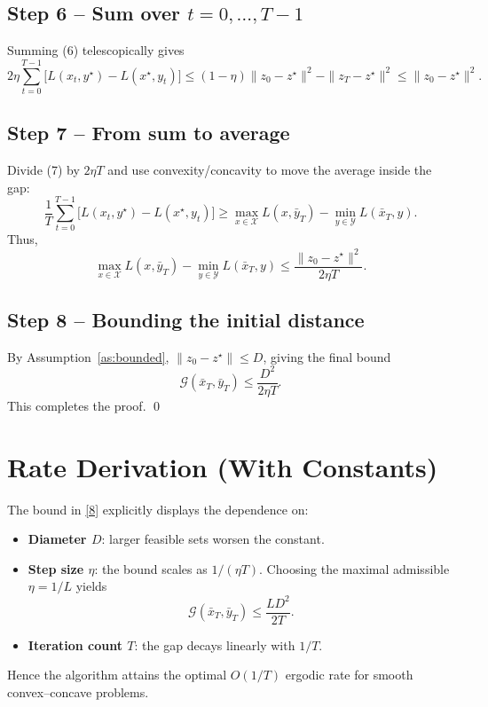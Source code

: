 \documentclass{article}
\begin{document}
\subsection*{Step 6 – Sum over $t=0,\dots,T-1$}
Summing (6) telescopically gives
\[
2\eta\sum_{t=0}^{T-1}\bigl[L(x_{t},y^{\star})-L(x^{\star},y_{t})\bigr]
\le (1-\eta)\|z_{0}-z^{\star}\|^{2}-\|z_{T}-z^{\star}\|^{2}
\le \|z_{0}-z^{\star}\|^{2}. \tag{7}
\]

\subsection*{Step 7 – From sum to average}
Divide (7) by $2\eta T$ and use convexity/concavity to move the average inside the gap:
\[
\frac{1}{T}\sum_{t=0}^{T-1}\bigl[L(x_{t},y^{\star})-L(x^{\star},y_{t})\bigr]
\ge
\max_{x\in\mathcal{X}}L(x,\bar y_{T})-\min_{y\in\mathcal{Y}}L(\bar x_{T},y).
\]
Thus,
\[
\boxed{
\max_{x\in\mathcal{X}}L(x,\bar y_{T})-\min_{y\in\mathcal{Y}}L(\bar x_{T},y)
\le
\frac{\|z_{0}-z^{\star}\|^{2}}{2\eta T}.}
\tag{8}
\]

\subsection*{Step 8 – Bounding the initial distance}
By Assumption~\ref{as:bounded}, $\|z_{0}-z^{\star}\|\le D$, giving the final bound
\[
\mathcal{G}(\bar x_{T},\bar y_{T})\le\frac{D^{2}}{2\eta T}.
\]
This completes the proof. \qed

\section*{Rate Derivation (With Constants)}
The bound in \eqref{8} explicitly displays the dependence on:
\begin{itemize}
\item \textbf{Diameter $D$}: larger feasible sets worsen the constant.
\item \textbf{Step size $\eta$}: the bound scales as $1/(\eta T)$. Choosing the maximal admissible $\eta=1/L$ yields
\[
\mathcal{G}(\bar x_{T},\bar y_{T})\le \frac{L D^{2}}{2T}.
\]
\item \textbf{Iteration count $T$}: the gap decays linearly with $1/T$.
\end{itemize}
Hence the algorithm attains the optimal $O(1/T)$ ergodic rate for smooth convex–concave problems.

\end{document}
